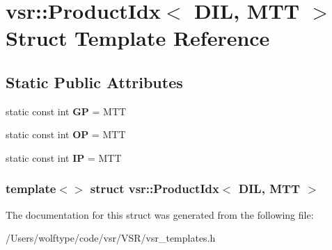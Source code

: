 \hypertarget{structvsr_1_1_product_idx_3_01_d_i_l_00_01_m_t_t_01_4}{\section{vsr\-:\-:Product\-Idx$<$ D\-I\-L, M\-T\-T $>$ Struct Template Reference}
\label{structvsr_1_1_product_idx_3_01_d_i_l_00_01_m_t_t_01_4}
}
\subsection*{Static Public Attributes}
\begin{DoxyCompactItemize}
\item 
\hypertarget{structvsr_1_1_product_idx_3_01_d_i_l_00_01_m_t_t_01_4_ae44dccb6ba86d6618d2035af112c5b19}{static const int {\bfseries G\-P} = M\-T\-T}\label{structvsr_1_1_product_idx_3_01_d_i_l_00_01_m_t_t_01_4_ae44dccb6ba86d6618d2035af112c5b19}

\item 
\hypertarget{structvsr_1_1_product_idx_3_01_d_i_l_00_01_m_t_t_01_4_a3f72669ea029369efeff7aa6aa623149}{static const int {\bfseries O\-P} = M\-T\-T}\label{structvsr_1_1_product_idx_3_01_d_i_l_00_01_m_t_t_01_4_a3f72669ea029369efeff7aa6aa623149}

\item 
\hypertarget{structvsr_1_1_product_idx_3_01_d_i_l_00_01_m_t_t_01_4_a9dc93ac4ae1a763985d4f8e71e187960}{static const int {\bfseries I\-P} = M\-T\-T}\label{structvsr_1_1_product_idx_3_01_d_i_l_00_01_m_t_t_01_4_a9dc93ac4ae1a763985d4f8e71e187960}

\end{DoxyCompactItemize}
\subsubsection*{template$<$$>$ struct vsr\-::\-Product\-Idx$<$ D\-I\-L, M\-T\-T $>$}



The documentation for this struct was generated from the following file\-:\begin{DoxyCompactItemize}
\item 
/\-Users/wolftype/code/vsr/\-V\-S\-R/vsr\-\_\-templates.\-h\end{DoxyCompactItemize}
